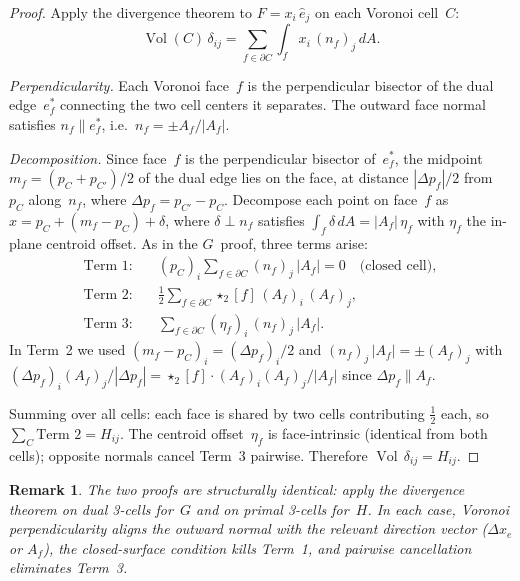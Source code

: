 \documentclass[preprint,12pt]{elsarticle}
\newtheorem{remark}{Remark}[section]
\DeclareMathOperator{\Vol}{Vol}
\begin{document}
\begin{proof}
Apply the divergence theorem to $F = x_i\, \hat{e}_j$ on each Voronoi
cell~$C$:
\begin{equation}
  \Vol(C)\, \delta_{ij}
    = \sum_{f \in \partial C} \int_f x_i\, (n_f)_j\, dA.
  \label{eq:div_thm_H}
\end{equation}

\emph{Perpendicularity.}
Each Voronoi face~$f$ is the perpendicular bisector of the dual edge~$e^*_f$
connecting the two cell centers it separates. The outward face normal
satisfies $n_f \parallel e^*_f$, i.e.\ $n_f = \pm A_f / |A_f|$.

\emph{Decomposition.}
Since face~$f$ is the perpendicular bisector of~$e^*_f$, the midpoint
$m_f = (p_C + p_{C'})/2$ of the dual edge lies on the face, at distance
$|\Delta p_f|/2$ from~$p_C$ along~$n_f$, where $\Delta p_f = p_{C'} - p_C$.
Decompose each point on face~$f$ as $x = p_C + (m_f - p_C) + \delta$,
where $\delta \perp n_f$ satisfies
$\int_f \delta\, dA = |A_f|\, \eta_f$ with $\eta_f$ the in-plane
centroid offset. As in the $G$~proof, three terms arise:
\begin{align}
  \text{Term 1:} &\quad
    (p_C)_i \sum_{f \in \partial C} (n_f)_j\, |A_f| = 0
    \quad\text{(closed cell)},
  \label{eq:term1_H} \\
  \text{Term 2:} &\quad
    \tfrac{1}{2} \sum_{f \in \partial C}
    \star_2[f]\, (A_f)_i\, (A_f)_j,
  \label{eq:term2_H} \\
  \text{Term 3:} &\quad
    \sum_{f \in \partial C} (\eta_f)_i\, (n_f)_j\, |A_f|.
  \label{eq:term3_H}
\end{align}
In Term~2 we used $(m_f - p_C)_i = (\Delta p_f)_i / 2$ and
$(n_f)_j\, |A_f| = \pm (A_f)_j$ with
$(\Delta p_f)_i (A_f)_j / |\Delta p_f|
= \star_2[f] \cdot (A_f)_i (A_f)_j / |A_f|$
since $\Delta p_f \parallel A_f$.

Summing over all cells: each face is shared by two cells contributing
$\tfrac{1}{2}$ each, so $\sum_C \text{Term~2} = H_{ij}$.
The centroid offset~$\eta_f$ is face-intrinsic (identical from both cells);
opposite normals cancel Term~3 pairwise.
Therefore $\Vol\, \delta_{ij} = H_{ij}$.
\end{proof}

\begin{remark}
The two proofs are structurally identical: apply the divergence theorem
on dual 3-cells for~$G$ and on primal 3-cells for~$H$. In each case,
Voronoi perpendicularity aligns the outward normal with the relevant
direction vector ($\Delta x_e$ or $A_f$), the closed-surface condition
kills Term~1, and pairwise cancellation eliminates Term~3.
\end{remark}
\end{document}

